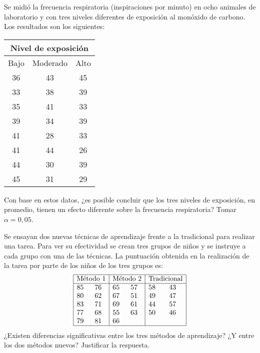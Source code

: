 {Se midió la frecuencia respiratoria (inspiraciones por minuto) en ocho animales de laboratorio y con tres niveles
diferentes de exposición al monóxido de carbono.
Los resultados son los siguientes:
\begin{center}
\begin{tabular}{lll}
\multicolumn{3}{c}{Nivel de exposición} \\
\hline
\multicolumn{1}{c}{Bajo} & \multicolumn{1}{c}{Moderado} & \multicolumn{1}{c}{Alto} \\
\hline
\multicolumn{1}{c}{36} & \multicolumn{1}{c}{43} & \multicolumn{1}{c}{45} \\
\multicolumn{1}{c}{33} & \multicolumn{1}{c}{38} & \multicolumn{1}{c}{39} \\
\multicolumn{1}{c}{35} & \multicolumn{1}{c}{41} & \multicolumn{1}{c}{33} \\
\multicolumn{1}{c}{39} & \multicolumn{1}{c}{34} & \multicolumn{1}{c}{39} \\
\multicolumn{1}{c}{41} & \multicolumn{1}{c}{28} & \multicolumn{1}{c}{33} \\
\multicolumn{1}{c}{41} & \multicolumn{1}{c}{44} & \multicolumn{1}{c}{26} \\
\multicolumn{1}{c}{44} & \multicolumn{1}{c}{30} & \multicolumn{1}{c}{39} \\
\multicolumn{1}{c}{45} & \multicolumn{1}{c}{31} & \multicolumn{1}{c}{29} \\
\hline
\end{tabular}
\end{center}
Con base en estos datos, ¿es posible concluir que los tres niveles de exposición, en promedio, tienen un efecto diferente sobre la frecuencia respiratoria?
Tomar $\alpha=0,05$.
}


{Se ensayan dos nuevas técnicas de aprendizaje frente a la tradicional para realizar una tarea.
Para ver su efectividad se crean tres grupos de niños y se instruye a cada grupo con una de las técnicas.
La puntuación obtenida en la realización de la tarea por parte de los niños de los tres grupos es:
\[
\begin{array}{|cc|cc|cc|}
\hline
\multicolumn{2}{|c|}{\mbox{Método 1}} & \multicolumn{2}{c|}{\mbox{Método 2}} & \multicolumn{2}{c|}{\mbox{Tradicional}}\\
\hline
85 & 76 & 65 & 57 & 58 & 43 \\
80 & 62 & 67 & 51 & 49 & 47 \\
83 & 71 & 69 & 61 & 44 & 57 \\
77 & 68 & 55 & 63 & 50 & 46 \\
79 & 81 & 66 &    &    &    \\
\hline
\end{array} 
\]
¿Existen diferencias significativas entre los tres métodos de aprendizaje?
¿Y entre los dos métodos nuevos?
Justificar la respuesta. 
}


